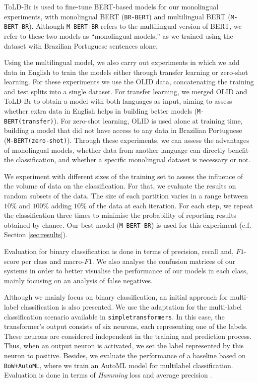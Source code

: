 \documentclass[11pt,a4paper]{article}
\begin{document}
ToLD-Br is used to fine-tune BERT-based models for our monolingual experiments, with monolingual BERT (\texttt{BR-BERT}) and multilingual BERT (\texttt{M-BERT-BR}). Although \texttt{M-BERT-BR} refers to the multilingual version of BERT, we refer to these two models as ``monolingual models,'' as we trained using the dataset with Brazilian Portuguese sentences alone.

Using the multilingual model, we also carry out experiments in which we add data in English to train the models either through transfer learning or zero-shot learning. For these experiments we use the OLID data, concatenating the training and test splits into a single dataset. For transfer learning, we merged OLID and ToLD-Br to obtain a model with both languages as input, aiming to assess whether extra data in English helps in building better models (\texttt{M-BERT(transfer)}). For zero-shot learning, OLID is used alone at training time, building a model that did not have access to any data in Brazilian Portuguese (\texttt{M-BERT(zero-shot)}). Through these experiments, we can assess the advantages of monolingual models, whether data from another language can directly benefit the classification, and whether a specific monolingual dataset is necessary or not.

We experiment with different sizes of the training set to assess the influence of the volume of data on the classification. For that, we evaluate the results on random subsets of the data. The size of each partition varies in a range between $10$\% and $100$\% adding $10$\% of the data at each iteration. For each step, we repeat the classification three times to minimise the probability of reporting results obtained by chance. Our best model (\texttt{M-BERT-BR}) is used for this experiment (c.f. Section \ref{sec:results}).

Evaluation for binary classification is done in terms of precision, recall and, $F1$-score per class and macro-$F1$. We also analyse the confusion matrices of our systems in order to better visualise the performance of our models in each class, mainly focusing on an analysis of false negatives. 

Although we mainly focus on binary classification, an initial approach for multi-label classification is also presented. We use the adaptation for the multi-label classification scenario available in \texttt{simpletransformers}. In this case, the transformer's output consists of six neurons, each representing one of the labels. These neurons are considered independent in the training and prediction process. Thus, when an output neuron is activated, we set the label represented by this neuron to positive.
Besides, we evaluate the performance of a baseline based on \texttt{BoW+AutoML}, where we train an AutoML model for multilabel classification. Evaluation is done in terms of \textit{Hamming} loss and average precision \cite{tsoumakas2009mining}.
\end{document}
